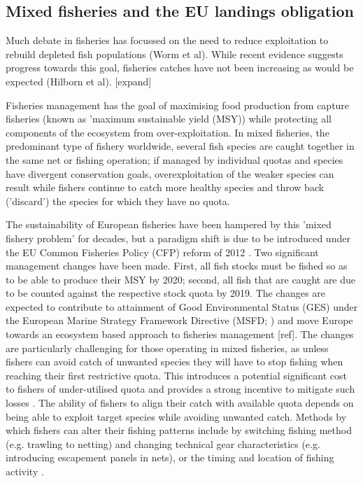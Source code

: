 \documentclass{nature}
\begin{document}
\begin{linenumbers}
\begin{abstract}
[265 words]

\end{abstract}

\section*{}

\subsection{Mixed fisheries and the EU landings obligation} 

Much debate in fisheries has focussed on the need to reduce exploitation to
rebuild depleted fish populations (Worm et al). While recent evidence suggests
progress towards this goal, fisheries catches have not been increasing as would
be expected (Hilborn et al). [expand] 

Fisheries management has the goal of maximising food production from capture
fisheries (known as 'maximum sustainable yield (MSY)) while protecting all
components of the ecosystem from over-exploitation. In mixed fisheries, the
predominant type of fishery worldwide, several fish species are caught together
in the same net or fishing operation; if managed by individual quotas and
species have divergent conservation goals, overexploitation of the weaker
species can result while fishers continue to catch more healthy species and
throw back ('discard') the species for which they have no quota.

The sustainability of European fisheries have been hampered by this 'mixed
fishery problem' for decades, but a paradigm shift is due to be introduced
under the EU Common Fisheries Policy (CFP) reform of 2012
\cite{EuropeanParliamentandCounciloftheEuropeanUnion2013}. Two significant
management changes have been made. First, all fish stocks must be fished so as
to be able to produce their MSY by 2020; second, all fish that are caught are
due to be counted against the respective stock quota by 2019. The changes are
expected to contribute to attainment of Good Environmental Status (GES) under
the European Marine Strategy Framework Directive (MSFD;
\cite{EuropeanParliament2008}) and move Europe towards an ecosystem based
approach to fisheries management [ref]. The changes are particularly
challenging for those operating in mixed fisheries, as unless fishers can avoid
catch of unwanted species they will have to stop fishing when reaching their
first restrictive quota. This introduces a potential significant cost to
fishers of under-utilised quota\cite{Hoff2010a, Ulrich2016} and provides a
strong incentive to mitigate such losses \cite{Condie2013, Condie2013a}. The
ability of fishers to align their catch with available quota depends on being
able to exploit target species while avoiding unwanted catch. Methods by which
fishers can alter their fishing patterns include by switching fishing method
(e.g. trawling to netting) and changing technical gear characteristics (e.g.
introducing escapement panels in nets), or the timing and location of fishing
activity \cite{Fulton2011b, vanPutten2012a}.


\end{linenumbers}
\end{document}
